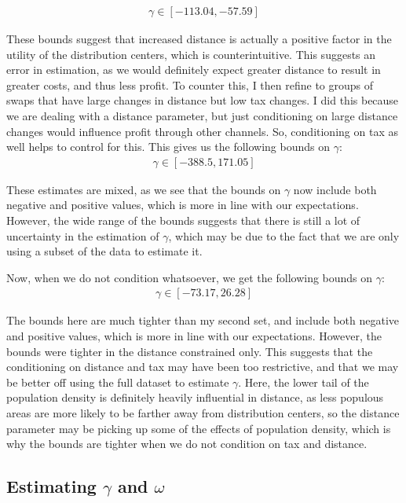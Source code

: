 \documentclass[11pt]{article}
\theoremstyle{definition}
\theoremstyle{remark}
\begin{document}
\begin{gather*}
  \gamma \in [-113.04, -57.59]
\end{gather*}

These bounds suggest that increased distance is actually a positive factor in the utility of the distribution centers, which is counterintuitive. This suggests an error in estimation, as we would definitely expect greater distance to result in greater costs, and thus less profit. To counter this, I then refine to groups of swaps that have large changes in distance but low tax changes. I did this because we are dealing with a distance parameter, but just conditioning on large distance changes would influence profit through other channels. So, conditioning on tax as well helps to control for this. This gives us the following bounds on $\gamma$:
\begin{gather*}
  \gamma \in [-388.5, 171.05]
\end{gather*}

These estimates are mixed, as we see that the bounds on $\gamma$ now include both negative and positive values, which is more in line with our expectations. However, the wide range of the bounds suggests that there is still a lot of uncertainty in the estimation of $\gamma$, which may be due to the fact that we are only using a subset of the data to estimate it.

Now, when we do not condition whatsoever, we get the following bounds on $\gamma$:
\begin{gather*}
  \gamma \in [-73.17, 26.28]
\end{gather*}

The bounds here are much tighter than my second set, and include both negative and positive values, which is more in line with our expectations. However, the bounds were tighter in the distance constrained only. This suggests that the conditioning on distance and tax may have been too restrictive, and that we may be better off using the full dataset to estimate $\gamma$. Here, the lower tail of the population density is definitely heavily influential in distance, as less populous areas are more likely to be farther away from distribution centers, so the distance parameter may be picking up some of the effects of population density, which is why the bounds are tighter when we do not condition on tax and distance.

\subsection{Estimating $\gamma$ and $\omega$}


\end{document}
